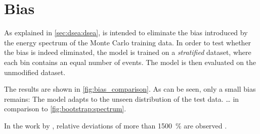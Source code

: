 \clearpage %
\section{Bias}
As explained in \autoref{sec:dsea:dsea},
\dsea{} is intended to eliminate the bias introduced by the energy spectrum of the Monte Carlo training data.
%
In order to test
whether the bias is indeed eliminated,
the model is trained on a \emph{stratified} dataset,
    where each bin contains an equal number of events.
The model is then evaluated on the unmodified dataset.

The results are shown in \autoref{fig:bias_comparison}.
As can be seen,
only a small bias remains:
The model adapts to the unseen distribution of the test data.
… in comparison to \autoref{fig:bootstrap:spectrum}.

In the work by \citeauthor{dsea_samuel},
relative deviations of more than \SI{1500}{\percent} are observed \cite{dsea_samuel}.


